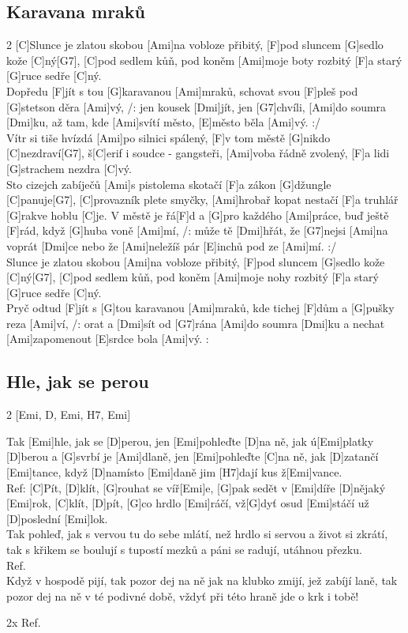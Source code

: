 \documentclass[12pt]{article}
\begin{document}
\subsection{Karavana mraků}
\begin{multicols}{2}
	[C]Slunce je zlatou skobou [Ami]na vobloze přibitý,
	[F]pod sluncem [G]sedlo kože [C]ný[G7],
	[C]pod sedlem kůň, 
	pod koněm [Ami]moje boty rozbitý
	[F]a starý [G]ruce sedře [C]ný.
	\\
	[C7]Dopředu [F]jít s tou [G]karavanou [Ami]mraků,
	schovat svou [F]pleš pod [G]stetson děra [Ami]vý,
	/: jen kousek [Dmi]jít, jen [G7]chvíli, [Ami]do soumra [Dmi]ku,
	až tam, kde [Ami]svítí město, [E]město běla [Ami]vý. :/
	\\
	[C]Vítr si tiše hvízdá [Ami]po silnici spálený,
	[F]v tom městě [G]nikdo [C]nezdraví[G7], 
	š[C]erif i soudce - gangsteři, 
	[Ami]voba řádně zvolený,
	[F]a lidi [G]strachem nezdra [C]vý.
	\\
	[C]Sto cizejch zabíječů [Ami]s pistolema skotačí
	[F]a zákon [G]džungle [C]panuje[G7], 
	[C]provazník plete smyčky, 
	[Ami]hrobař kopat nestačí
	[F]a truhlář [G]rakve hoblu [C]je.
	\columnbreak
	[C7]V městě je řá[F]d a [G]pro každého [Ami]práce,
	buď ještě [F]rád, když [G]huba voně [Ami]mí,
	/: může tě [Dmi]hřát, že [G7]nejsi [Ami]na voprát [Dmi]ce
	nebo že [Ami]neležíš pár [E]inchů pod ze [Ami]mí. :/
	\\
	[C]Slunce je zlatou skobou [Ami]na vobloze přibitý,
	[F]pod sluncem [G]sedlo kože [C]ný[G7], 
	[C]pod sedlem kůň, 
	pod koněm [Ami]moje nohy rozbitý
	[F]a starý [G]ruce sedře [C]ný.
	\\
	[C7]Pryč odtud [F]jít s [G]tou karavanou [Ami]mraků,
	kde tichej [F]dům a [G]pušky reza [Ami]ví,
	/: orat a [Dmi]sít od [G7]rána [Ami]do soumra [Dmi]ku
	a nechat [Ami]zapomenout [E]srdce bola [Ami]vý. :	
\end{multicols}

\subsection{Hle, jak se perou}
\begin{multicols}{2}
	[Emi, D, Emi, H7, Emi]
	
	Tak [Emi]hle, jak se [D]perou, jen [Emi]pohleďte [D]na ně,
	jak ú[Emi]platky [D]berou a [G]svrbí je [Ami]dlaně,
	jen [Emi]pohleďte [C]na ně, jak [D]zatančí [Emi]tance,
	když [D]namísto [Emi]daně jim [H7]dají kus ž[Emi]vance.
	\\
	Ref: [C]Pít, [D]klít, [G]rouhat se víř[Emi]e,
	[G]pak sedět v [Emi]díře [D]nějaký [Emi]rok,
	[C]klít, [D]pít, [G]co hrdlo [Emi]ráčí,
	vž[G]dyť osud [Emi]stáčí už [D]poslední [Emi]lok.
	\\
	Tak pohleď, jak s vervou tu do sebe mlátí,
	než hrdlo si servou a život si zkrátí,
	tak s křikem se boulují s tupostí mezků
	a páni se radují, utáhnou přezku.
	\\
	Ref.
	\\
	Když v hospodě pijí, tak pozor dej na ně
	jak na klubko zmijí, jež zabíjí laně,
	tak pozor dej na ně v té podivné době,
	vždyť při této hraně jde o krk i tobě!
	
	2x Ref.	
\end{multicols}
\end{document}

